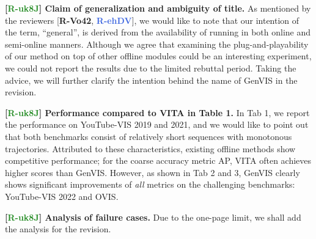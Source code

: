 \documentclass[10pt,twocolumn,letterpaper]{article}
\newcommand{\rr}{{\textcolor{WildStrawberry}{\textbf{R-Vo42}}}}
\newcommand{\rb}{{\textcolor{RoyalBlue}{\textbf{R-ehDV}}}}
\newcommand{\rg}{{\textcolor{ForestGreen}{\textbf{R-uk8J}}}}
\begin{document}
\noindent \textbf{[\rg] Claim of generalization and ambiguity of title.}
As mentioned by the reviewers [\rr{}, \rb{}], we would like to note that our intention of the term, ``general'', is derived from the availability of running in both online and semi-online manners.
Although we agree that examining the plug-and-playability of our method on top of other offline modules could be an interesting experiment, we could not report the results due to the limited rebuttal period.
Taking the advice, we will further clarify the intention behind the name of GenVIS in the revision.


\noindent \textbf{[\rg] Performance compared to VITA in Table 1.}
In Tab {\color{Red}1}, we report the performance on YouTube-VIS 2019 and 2021, and we would like to point out that both benchmarks consist of relatively short sequences with monotonous trajectories.
Attributed to these characteristics, existing offline methods show competitive performance; for the coarse accuracy metric AP, VITA often achieves higher scores than GenVIS.
However, as shown in Tab {\color{Red}2} and {\color{Red}3}, GenVIS clearly shows significant improvements of \textit{all} metrics on the challenging benchmarks: YouTube-VIS 2022 and OVIS.


\noindent \textbf{[\rg] Analysis of failure cases.}
Due to the one-page limit, we shall add the analysis for the revision.
\end{document}
